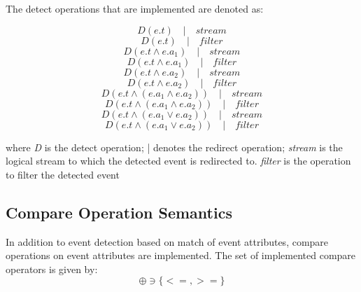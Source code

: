 \begin{flushleft}
The detect operations that are implemented are denoted as:

\begin{equation}
D(e.t) \quad | \quad stream
\end{equation}
\begin{equation}
D(e.t) \quad | \quad filter
\end{equation}
\begin{equation}
D(e.t  \wedge e.a_1) \quad | \quad stream
\end{equation}
\begin{equation}
D(e.t  \wedge e.a_1) \quad | \quad filter
\end{equation}
\begin{equation}
D(e.t  \wedge e.a_2) \quad | \quad stream
\end{equation}
\begin{equation}
D(e.t  \wedge e.a_2) \quad | \quad filter
\end{equation}
\begin{equation}
D(e.t  \wedge (e.a_1 \wedge e.a_2)) \quad | \quad stream
\end{equation}
\begin{equation}
D(e.t  \wedge (e.a_1 \wedge e.a_2)) \quad | \quad filter
\end{equation}
\begin{equation} 
D(e.t  \wedge (e.a_1  \vee e.a_2 )) \quad | \quad stream
\end{equation}
\begin{equation} 
D(e.t  \wedge (e.a_1  \vee e.a_2 )) \quad | \quad filter
\end{equation}

where \textit{D} is the detect operation; \newline
| denotes the redirect operation; \newline
\textit{stream} is the logical stream to which the detected event is redirected to.\newline
\textit{filter} is the operation to filter the detected event \newline \newline
\end{flushleft}


\subsection{Compare Operation Semantics}
In addition to event detection based on match of event attributes, compare operations on event attributes are implemented. The set of implemented compare operators is given by:
\begin{equation}
\oplus  \ni  \lbrace <=,>= \rbrace
\end{equation}


